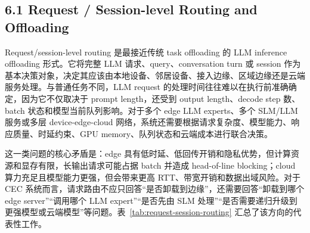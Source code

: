 \subsection*{6.1 Request / Session-level Routing and Offloading}

Request/session-level routing 是最接近传统 task offloading 的 LLM inference offloading 形式。它将完整 LLM 请求、query、conversation turn 或 session 作为基本决策对象，决定其应该由本地设备、邻居设备、接入边缘、区域边缘还是云端服务处理。与普通任务不同，LLM request 的处理时间往往难以在执行前准确确定，因为它不仅取决于 prompt length，还受到 output length、decode step 数、batch 状态和模型当前队列影响。对于多个 edge LLM experts、多个 SLM/LLM 服务或多层 device-edge-cloud 网络，系统还需要根据请求复杂度、模型能力、响应质量、时延约束、GPU memory、队列状态和云端成本进行联合决策。


这一类问题的核心矛盾是：edge 具有低时延、低回传开销和隐私优势，但计算资源和显存有限，长输出请求可能占据 batch 并造成 head-of-line blocking；cloud 算力充足且模型能力更强，但会带来更高 RTT、带宽开销和数据出域风险。对于 CEC 系统而言，请求路由不应只回答“是否卸载到边缘”，还需要回答“卸载到哪个 edge server”“调用哪个 LLM expert”“是否先由 SLM 处理”“是否需要递归升级到更强模型或云端模型”等问题。表~\ref{tab:request-session-routing} 汇总了该方向的代表性工作。


